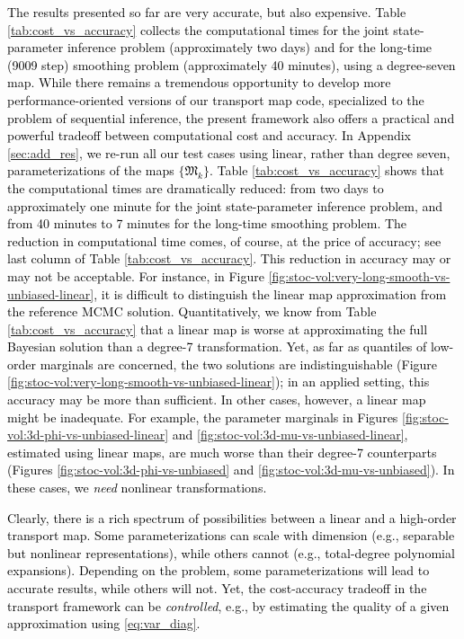 \documentclass[twoside,11pt]{article}
\newcommand{\submap}{\mathfrak{M}}
\newcommand{\hrevone}{\textcolor{black} }
\begin{document}
\hrevone{ 
The results presented so far are very accurate, but also expensive.
Table \ref{tab:cost_vs_accuracy} collects the computational times
for the joint state-parameter inference problem (approximately two days) and for the
long-time (9009 step) smoothing problem (approximately 40 minutes), using a
degree-seven map.
While there remains a tremendous opportunity to develop %
more performance-oriented versions of our transport map code, specialized to the
problem of sequential inference, 
%
the present framework also offers a practical and powerful tradeoff
between computational 
cost
and accuracy.  In Appendix \ref{sec:add_res}, we re-run all our test
cases using linear, rather than degree seven, parameterizations of
the maps $\{ \submap_k\}$.  Table \ref{tab:cost_vs_accuracy} shows
that the computational times are dramatically reduced: from two days
to approximately one minute for the joint state-parameter inference
problem, and from 40 minutes to 7 minutes for the long-time smoothing
problem.  The reduction in computational time comes, of course, at the
price of accuracy; see last column of Table
\ref{tab:cost_vs_accuracy}.  This reduction in accuracy may or may not
be acceptable.  For instance, in Figure
\ref{fig:stoc-vol:very-long-smooth-vs-unbiased-linear}, it is
difficult to distinguish the linear map approximation from the
reference MCMC solution.  Quantitatively, we know from Table
\ref{tab:cost_vs_accuracy} that a linear map is worse at approximating
the full Bayesian solution than a degree-7 transformation.
%
Yet, as far as quantiles of low-order marginals  are concerned, the two solutions are
indistinguishable (Figure \ref{fig:stoc-vol:very-long-smooth-vs-unbiased-linear}); in an applied setting, this accuracy may be more than sufficient.
%
In other cases, however, a linear map might be inadequate. For example, the parameter marginals in Figures 
\ref{fig:stoc-vol:3d-phi-vs-unbiased-linear}
and
\ref{fig:stoc-vol:3d-mu-vs-unbiased-linear}, estimated using linear maps,
are much worse than their degree-7 counterparts (Figures
\ref{fig:stoc-vol:3d-phi-vs-unbiased} and
\ref{fig:stoc-vol:3d-mu-vs-unbiased}). 
In these cases, we \emph{need} nonlinear transformations.
}

\hrevone{Clearly, there is a rich spectrum of possibilities between a
linear and a high-order transport map. Some parameterizations can
scale with dimension (e.g., separable but nonlinear representations),
while others cannot (e.g., total-degree polynomial expansions).  
Depending on the problem, some
parameterizations will lead to
accurate results, while others will not.
Yet, the cost-accuracy tradeoff %
%
%
in
the transport framework can be
{\it controlled}, e.g., by estimating %
%
%
the {quality} of a given approximation 
%
using
\eqref{eq:var_diag}.}
\end{document}
